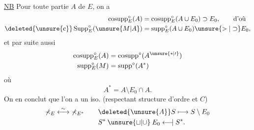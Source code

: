 \uline{NB} Pour toute partie $A$ de $E$, on a
\[
\begin{aligned}
\operatorname{cosupp}_{E}^{\circ}(A)&=\operatorname{cosupp}_{E}^{\circ}(A\cup E_{0})\supset E_{0},\qquad\text{d'où}\\
\deleted{\unsure{\mathrm{c}}}\operatorname{Supp}_{E}^{\circ}(\unsure{M|A})&=\operatorname{supp}_{E}^{\circ}(A\cup E_{0})\unsure{>|\supset} E_{0},
\end{aligned}
\]
et par suite aussi
\[
\begin{aligned}
\operatorname{cosupp}_{E}^{\circ}(A)&=\operatorname{cosupp}^{\circ}(A^{\unsure{\ast|\prime}})\\
\operatorname{supp}_{E}^{\circ}(M)&=\operatorname{supp}^{\circ}(A^{\ast})
\end{aligned}
\]
où
\[
A^{\ast}=A\setminus E_{0}\cap A.
\]
On en conclut que l'on a un iso. (respectant structure d'ordre et $C$)
\[
\begin{aligned}
\mathbb{\Sigma}_{E}\mathrel{\overset{\sim}{\longleftrightarrow}}\mathbb{\Sigma}_{E^{\ast}}\qquad &\deleted{\unsure{A}}S\longmapsto S\setminus E_{0}\\
&S^{\ast}\mathbin{\unsure{\sqcup|\cup}}E_{0}\mathrel{\longleftarrow\mkern-9mu\vert} S^{\ast}.
\end{aligned}
\]
